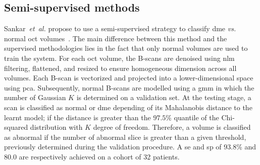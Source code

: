 \subsection{Semi-supervised methods}

Sankar~\textit{et~al.} propose to use a semi-supervised strategy to classify \gls{dme} \emph{vs.} normal \gls{oct} volumes~\cite{sankar2016classification}.
The main difference between this method and the supervised methodologies lies in the fact that only normal volumes are used to train the system.
For each \gls{oct} volume, the B-scans are denoised using \gls{nlm} filtering, flattened, and resized to ensure homogeneous dimension across all volumes.
Each B-scan is vectorized and projected into a lower-dimensional space using \gls{pca}.
Subsequently, normal B-scans are modelled using a \gls{gmm} in which the number of Gaussian $K$ is determined on a validation set.
At the testing stage, a scan is classified as normal or \gls{dme} depending of its Mahalanobis distance to the learnt model; if the distance is greater than the $97.5 \%$ quantile of the Chi-squared distribution with $K$ degree of freedom.
Therefore, a volume is classified as abnormal if the number of abnormal slice is greater than a given threshold, previously determined during the validation procedure.
A \gls{se} and \gls{sp} of $93.8 \%$ and $80.0$ are respectively achieved on a cohort of 32 patients.